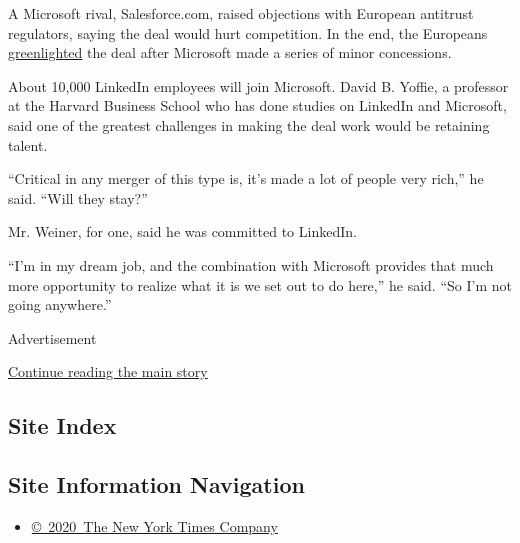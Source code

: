 A Microsoft rival, Salesforce.com, raised objections with European
antitrust regulators, saying the deal would hurt competition. In the
end, the Europeans
\href{https://blogs.microsoft.com/blog/2016/12/06/microsoft-linkedin-deal-cleared-regulators-opening-doors-people-around-world/\#sm.00000d2vaycgfmeqvrs5xuf7ztpe9}{greenlighted}
the deal after Microsoft made a series of minor concessions.

About 10,000 LinkedIn employees will join Microsoft. David B. Yoffie, a
professor at the Harvard Business School who has done studies on
LinkedIn and Microsoft, said one of the greatest challenges in making
the deal work would be retaining talent.

``Critical in any merger of this type is, it's made a lot of people very
rich,'' he said. ``Will they stay?''

Mr. Weiner, for one, said he was committed to LinkedIn.

``I'm in my dream job, and the combination with Microsoft provides that
much more opportunity to realize what it is we set out to do here,'' he
said. ``So I'm not going anywhere.''

Advertisement

\protect\hyperlink{after-bottom}{Continue reading the main story}

\hypertarget{site-index}{%
\subsection{Site Index}\label{site-index}}

\hypertarget{site-information-navigation}{%
\subsection{Site Information
Navigation}\label{site-information-navigation}}

\begin{itemize}
\tightlist
\item
  \href{https://help.nytimes.com/hc/en-us/articles/115014792127-Copyright-notice}{©~2020~The
  New York Times Company}
\end{itemize}

